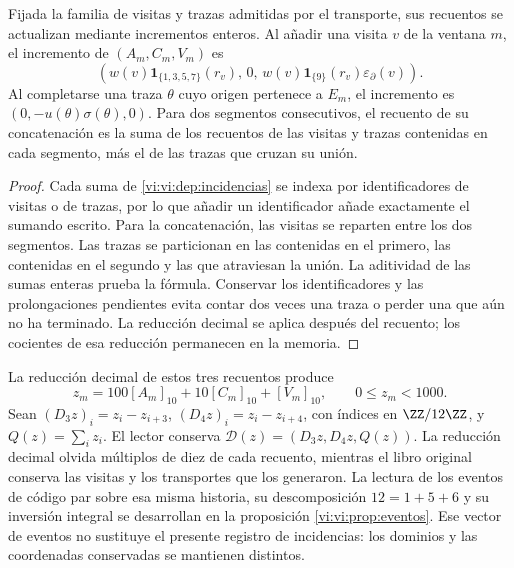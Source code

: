 \begin{proposition}
\label{vi:vi:dep:libro-actualizacion}
Fijada la familia de visitas y trazas admitidas por el transporte, sus
recuentos se actualizan mediante incrementos enteros. Al añadir una
visita \(v\) de la ventana \(m\), el incremento de \((A_m,C_m,V_m)\) es
\[
 \left(w(v)\mathbf1_{\{1,3,5,7\}}(r_v),\,0,\,
 w(v)\mathbf1_{\{9\}}(r_v)\varepsilon_\partial(v)\right).
\]
Al completarse una traza \(\theta\) cuyo origen pertenece a \(E_m\),
el incremento es \((0,-u(\theta)\sigma(\theta),0)\).
Para dos segmentos consecutivos, el recuento de su concatenación es
la suma de los recuentos de las visitas y trazas contenidas en cada
segmento, más el de las trazas que cruzan su unión.
\end{proposition}
\begin{proof}
Cada suma de \eqref{vi:vi:dep:incidencias} se indexa por identificadores
de visitas o de trazas, por lo que añadir un identificador añade
exactamente el sumando escrito. Para la concatenación, las visitas
se reparten entre los dos segmentos. Las trazas se particionan en
las contenidas en el primero, las contenidas en el segundo y las
que atraviesan la unión. La aditividad de las sumas enteras prueba
la fórmula. Conservar los identificadores y las prolongaciones
pendientes evita contar dos veces una traza o perder una que aún
no ha terminado. La reducción decimal se aplica después del
recuento; los cocientes de esa reducción permanecen en la memoria.
\end{proof}

La reducción decimal de estos tres recuentos produce
\begin{equation}
 z_m=100[A_m]_{10}+10[C_m]_{10}+[V_m]_{10},
 \qquad 0\le z_m<1000.
 \label{vi:vi:dep:bloque-incidencial}
\end{equation}
Sean \((D_3z)_i=z_i-z_{i+3}\),
\((D_4z)_i=z_i-z_{i+4}\), con índices en \(\ZZ/12\ZZ\), y
\(Q(z)=\sum_i z_i\). El lector conserva
\(\mathcal D(z)=(D_3z,D_4z,Q(z))\). La reducción decimal olvida
múltiplos de diez de cada recuento, mientras el libro original conserva
las visitas y los transportes que los generaron.
La lectura de los eventos de código par sobre esa misma historia,
su descomposición \(12=1+5+6\) y su inversión integral se
desarrollan en la proposición \ref{vi:vi:prop:eventos}. Ese vector
de eventos no sustituye el presente registro de incidencias:
los dominios y las coordenadas conservadas se mantienen distintos.

